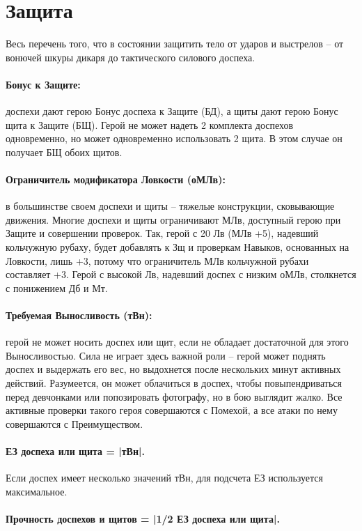 \section{Защита}
Весь перечень того, что в состоянии защитить тело от ударов и выстрелов – от вонючей шкуры дикаря до тактического силового доспеха. 
\paragraph{Бонус к Защите:} доспехи дают герою Бонус доспеха к Защите (БД), а щиты дают герою Бонус щита к Защите (БЩ).
\newline Герой не может надеть 2 комплекта доспехов одновременно, но может одновременно использовать 2 щита. В этом случае он получает БЩ обоих щитов.
\paragraph{Ограничитель модификатора Ловкости (оМЛв):} в большинстве своем доспехи и щиты – тяжелые конструкции, сковывающие движения. Многие доспехи и щиты ограничивают МЛв, доступный герою при Защите и совершении проверок. Так, герой с 20 Лв (МЛв +5), надевший кольчужную рубаху, будет добавлять к Зщ и проверкам Навыков, основанных на Ловкости, лишь +3, потому что ограничитель МЛв кольчужной рубахи составляет +3. Герой с высокой Лв, надевший доспех с низким оМЛв, столкнется с понижением Дб и Мт.
\paragraph{Требуемая Выносливость (тВн):} герой не может носить доспех или щит, если не обладает достаточной для этого Выносливостью. Сила не играет здесь важной роли – герой может поднять доспех и выдержать его вес, но выдохнется после нескольких минут активных действий. Разумеется, он может облачиться в доспех, чтобы повыпендриваться перед девчонками или попозировать фотографу, но в бою выглядит жалко. Все активные проверки такого героя совершаются с Помехой, а все атаки по нему совершаются с Преимуществом.
\paragraph{ЕЗ доспеха или щита = |тВн|.} Если доспех имеет несколько значений тВн, для подсчета ЕЗ используется максимальное.	
\paragraph{Прочность доспехов и щитов = |1/2 ЕЗ доспеха или щита|.} 
